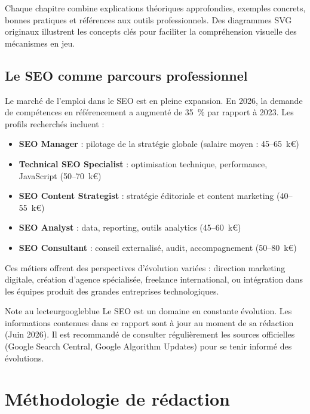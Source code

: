 \documentclass[12pt,a4paper,twoside]{report}
\newcommand{\keyword}[1]{\textbf{\textcolor{googleblue}{#1}}}
\begin{document}
Chaque chapitre combine explications théoriques approfondies, exemples concrets, bonnes pratiques et références aux outils professionnels. Des diagrammes SVG originaux illustrent les concepts clés pour faciliter la compréhension visuelle des mécanismes en jeu.

\section*{Le SEO comme parcours professionnel}

Le marché de l'emploi dans le SEO est en pleine expansion. En 2026, la demande de compétences en référencement a augmenté de 35~\% par rapport à 2023. Les profils recherchés incluent :

\begin{itemize}
    \item \keyword{SEO Manager} : pilotage de la stratégie globale (salaire moyen : 45--65~k€)
    \item \keyword{Technical SEO Specialist} : optimisation technique, performance, JavaScript (50--70~k€)
    \item \keyword{SEO Content Strategist} : stratégie éditoriale et content marketing (40--55~k€)
    \item \keyword{SEO Analyst} : data, reporting, outils analytics (45--60~k€)
    \item \keyword{SEO Consultant} : conseil externalisé, audit, accompagnement (50--80~k€)
\end{itemize}

Ces métiers offrent des perspectives d'évolution variées : direction marketing digitale, création d'agence spécialisée, freelance international, ou intégration dans les équipes produit des grandes entreprises technologiques.

\vspace{0.5cm}
\begin{mybox}{Note au lecteur}{googleblue}
Le SEO est un domaine en constante évolution. Les informations contenues dans ce rapport sont à jour au moment de sa rédaction (Juin 2026). Il est recommandé de consulter régulièrement les sources officielles (Google Search Central, Google Algorithm Updates) pour se tenir informé des évolutions.
\end{mybox}

\chapter*{Méthodologie de rédaction}
\end{document}
